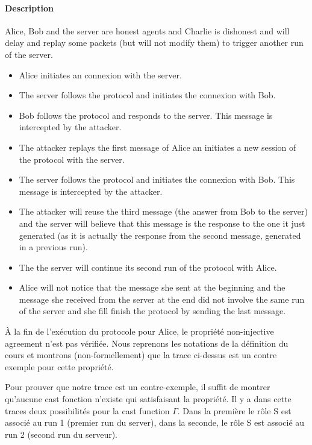 \documentclass[10pt,a4paper]{article}
\begin{document}
\paragraph{Description}
Alice, Bob and the server are honest agents and Charlie is dishonest and will delay and replay some packets (but will not modify them) to trigger another run of the server.
\begin{itemize}
 \item Alice initiates an connexion with the server.
 \item The server follows the protocol and initiates the connexion with Bob.
 \item Bob follows the protocol and responds to the server. This message is intercepted by the attacker.
 \item The attacker replays the first message of Alice an initiates a new session of the protocol with the server.
 \item The server follows the protocol and initiates the connexion with Bob. This message is intercepted by the attacker.
 \item The attacker will reuse the third message (the answer from Bob to the server) and the server will believe that this message is the response to the one it just generated (as it is actually the response from the second message, generated in a previous run).
 \item The the server will continue its second run of the protocol with Alice.
 \item Alice will not notice that the message she sent at the beginning and the message she received from the server at the end did not involve the same run of the server and she fill finish the protocol by sending the last message.
\end{itemize}


À la fin de l'exécution du protocole pour Alice, le propriété non-injective agreement n'est pas vérifiée.
Nous reprenons les notations de la définition du cours et montrons (non-formellement) que la trace ci-dessus est un contre exemple pour cette propriété.

Pour prouver que notre trace est un contre-exemple, il suffit de montrer qu'aucune cast fonction n'existe qui satisfaisant la propriété.
Il y a dans cette traces deux possibilités pour la cast function $\Gamma$. Dans la première le rôle S est associé au run 1 (premier run du server), dans la seconde, le rôle S est associé au run 2 (second run du serveur).
\end{document}

